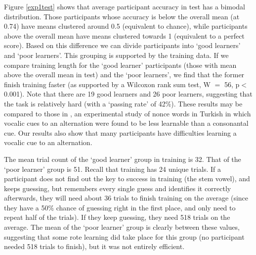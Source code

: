 \documentclass{frontiersSCNS} %
\begin{document}
Figure \ref{exp1test} shows that average participant accuracy in test has a bimodal distribution. Those participants whose accuracy is below the overall mean (at 0.74) have means clustered around 0.5 (equivalent to chance), while participants above the overall mean have means clustered towards 1 (equivalent to a perfect score). Based on this difference we can divide participants into `good learners' and `poor learners'. This grouping is supported by the training data. If we compare training length for the `good learner' participants (those with mean above the overall mean in test) and the `poor learners', we find that the former finish training faster (as supported by a Wilcoxon rank sum test, W $=$ 56, p$<$ 0.001). Note that there are 19 good learners and 26 poor learners, suggesting that the task is relatively hard (with a `passing rate' of 42\%). These results may be compared to those in \cite{becker2011}, an experimental study of nonce words in Turkish in which vocalic cues to an alternation were found to be less learnable than a consonantal cue. Our results also show that many participants have difficulties learning a vocalic cue to an alternation.

The mean trial count of the `good learner' group in training is 32. That of the `poor learner' group is 51. Recall that training has 24 unique trials. If a participant does not find out the key to success in training (the stem vowel), and keeps guessing, but remembers every single guess and identifies it correctly afterwards, they will need about 36 trials to finish training on the average (since they have a 50\% chance of guessing right in the first place, and only need to repeat half of the trials). If they keep guessing, they need 518 trials on the average. The mean of the `poor learner' group is clearly between these values, suggesting that some rote learning did take place for this group (no participant needed 518 trials to finish), but it was not entirely efficient. 
\end{document}
